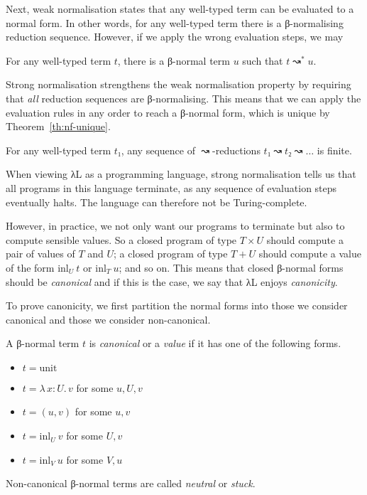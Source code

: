 \documentclass{scrartcl}
\theoremstyle{definition}
\newcommand{\Lam}[2]{λ\,#1.\, #2}
\newcommand{\unit}{\mathrm{unit}}
\newcommand{\inl}{\ensuremath{\mathrm{inl}}}
\begin{document}
Next, weak normalisation states that any well-typed term can be evaluated to a normal form.
In other words, for any well-typed term there is a β-normalising reduction sequence.
However, if we apply the wrong evaluation steps, we may

\begin{theorem}\label{th:wn}
  For any well-typed term $t$, there is a β-normal term $u$ such that $t ↝^{*} u$.
\end{theorem}

Strong normalisation strengthens the weak normalisation property by requiring that \emph{all} reduction sequences are β-normalising.
This means that we can apply the evaluation rules in any order to reach a β-normal form, which is unique by Theorem~\ref{th:nf-unique}.

\begin{theorem}\label{th:sn}
  For any well-typed term $t₁$, any sequence of $↝$-reductions $t₁ ↝ t₂ ↝ \dots$ is finite.
\end{theorem}

When viewing λL as a programming language, strong normalisation tells us that all programs in this language terminate, as any sequence of evaluation steps eventually halts.
The language can therefore not be Turing-complete.

However, in practice, we not only want our programs to terminate but also to compute sensible values.
So a closed program of type $T × U$ should compute a pair of values of $T$ and $U$; a closed program of type $T + U$ should compute a value of the form $\inl_{U}~t$ or $\inl_{T}~u$; and so on.
This means that closed β-normal forms should be \emph{canonical} and if this is the case, we say that λL enjoys \emph{canonicity}.

To prove canonicity, we first partition the normal forms into those we consider canonical and those we consider non-canonical.

\begin{definition}[Values]
  A β-normal term $t$ is \emph{canonical} or a \emph{value} if it has one of the following forms.
  \begin{itemize}
    \item $t = \unit$
    \item $t = \Lam{x : U}{v}$ for some $u, U, v$
    \item $t = (u, v)$ for some $u, v$
    \item $t = \inl_{U}~v$ for some $U, v$
    \item $t = \inl_{V}~u$ for some $V, u$
  \end{itemize}
  Non-canonical β-normal terms are called \emph{neutral} or \emph{stuck}.
\end{definition}
\end{document}
